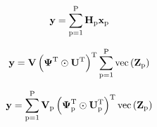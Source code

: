 \documentclass{article}
\newcommand{\numSources}{\text{P}}
\newcommand{\sourceIndex}{\text{p}}
\renewcommand{\vec}[1]{\text{vec}\left(#1\right)}
\begin{document}
\begin{equation}
\bby = \sum_{\sourceIndex=1}^{\numSources} \bbH_{\sourceIndex} \bbx_{\sourceIndex}
\end{equation}

\begin{equation}
\bby = \bbV \left(\bbPsi^{\rmT} \odot \bbU^{\rmT} \right)^{\rmT}\sum_{\sourceIndex=1}^{\numSources} \vec{\bbZ_{\sourceIndex}}
\end{equation}

\begin{equation}
\bby = \sum_{\sourceIndex=1}^{\numSources} \bbV_{\sourceIndex} \left(\bbPsi_{\sourceIndex}^{\rmT} \odot \bbU_{\sourceIndex}^{\rmT} \right)^{\rmT} \vec{\bbZ_{\sourceIndex}}
\end{equation}
\end{document}
